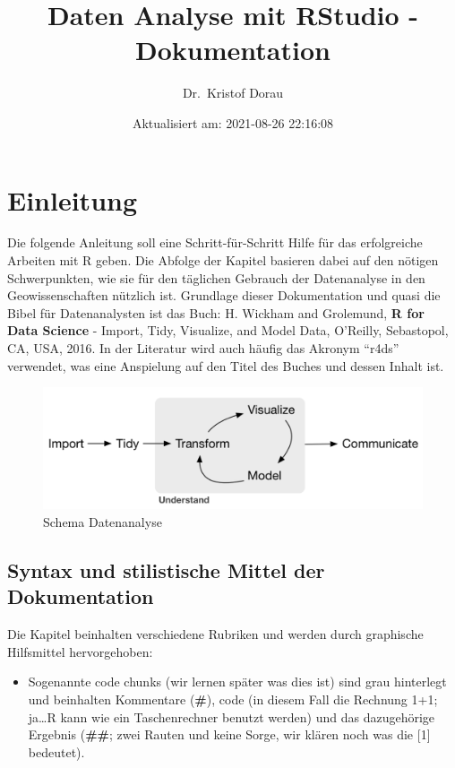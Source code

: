 \documentclass[
]{article}
\title{Daten Analyse mit RStudio - Dokumentation}
\author{Dr.~Kristof Dorau}
\date{Aktualisiert am: 2021-08-26 22:16:08}
\providecommand{\tightlist}{%
  \setlength{\itemsep}{0pt}\setlength{\parskip}{0pt}}
\begin{document}
\maketitle

{
\setcounter{tocdepth}{2}
\tableofcontents
}
\hypertarget{einleitung}{%
\section{Einleitung}\label{einleitung}}

Die folgende Anleitung soll eine Schritt-für-Schritt Hilfe für das erfolgreiche Arbeiten mit R geben. Die Abfolge der Kapitel basieren dabei auf den nötigen Schwerpunkten, wie sie für den täglichen Gebrauch der Datenanalyse in den Geowissenschaften nützlich ist. Grundlage dieser Dokumentation und quasi die Bibel für Datenanalysten ist das Buch: H. Wickham and Grolemund, \textbf{R for Data Science} - Import, Tidy, Visualize, and Model Data, O'Reilly, Sebastopol, CA, USA, 2016. In der Literatur wird auch häufig das Akronym ``r4ds'' verwendet, was eine Anspielung auf den Titel des Buches und dessen Inhalt ist.

\begin{figure}

{\centering \includegraphics[width=1\linewidth]{images/001} 

}

\caption{Schema Datenanalyse}\label{fig:unnamed-chunk-2}
\end{figure}

\hypertarget{syntax-und-stilistische-mittel-der-dokumentation}{%
\subsection{Syntax und stilistische Mittel der Dokumentation}\label{syntax-und-stilistische-mittel-der-dokumentation}}

Die Kapitel beinhalten verschiedene Rubriken und werden durch graphische Hilfsmittel hervorgehoben:

\begin{itemize}
\tightlist
\item
  Sogenannte code chunks (wir lernen später was dies ist) sind grau hinterlegt und beinhalten Kommentare (\textbf{\#}), code (in diesem Fall die Rechnung 1+1; ja\ldots R kann wie ein Taschenrechner benutzt werden) und das dazugehörige Ergebnis (\textbf{\#\#}; zwei Rauten und keine Sorge, wir klären noch was die {[}1{]} bedeutet).
\end{itemize}
\end{document}
